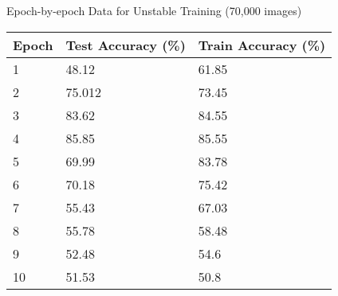 \begin{table}
	\centering 
	\large Epoch-by-epoch Data for Unstable Training (70,000 images)\\
	\normalsize
	\begin{tabular}{|l|l|l|}
		\hline
		\textbf{Epoch}	& \textbf{Test Accuracy (\%)} & \textbf{Train Accuracy (\%) }\\\hline 
            1	&48.12	&61.85 \\\hline
            2	&75.012	&73.45 \\\hline
            3	&83.62	&84.55 \\\hline
            4	&85.85	&85.55 \\\hline
            5	&69.99	&83.78 \\\hline
            6	&70.18	&75.42 \\\hline
            7	&55.43	&67.03 \\\hline
            8	&55.78	&58.48 \\\hline
            9	&52.48	&54.6  \\\hline
            10	&51.53	&50.8  \\\hline
	\end{tabular}
\end{table}



